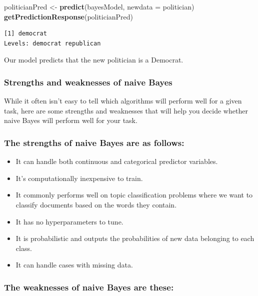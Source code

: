 \documentclass[
]{article}
\newenvironment{Shaded}{\begin{snugshade}}{\end{snugshade}}
\newcommand{\AttributeTok}[1]{\textcolor[rgb]{0.13,0.29,0.53}{#1}}
\newcommand{\FunctionTok}[1]{\textcolor[rgb]{0.13,0.29,0.53}{\textbf{#1}}}
\newcommand{\NormalTok}[1]{#1}
\newcommand{\OtherTok}[1]{\textcolor[rgb]{0.56,0.35,0.01}{#1}}
\providecommand{\tightlist}{%
  \setlength{\itemsep}{0pt}\setlength{\parskip}{0pt}}
\begin{document}
\begin{Shaded}
\begin{Highlighting}[]
\NormalTok{politicianPred }\OtherTok{\textless{}{-}} \FunctionTok{predict}\NormalTok{(bayesModel, }\AttributeTok{newdata =}\NormalTok{ politician)}
\FunctionTok{getPredictionResponse}\NormalTok{(politicianPred)}
\end{Highlighting}
\end{Shaded}

\begin{verbatim}
[1] democrat
Levels: democrat republican
\end{verbatim}

Our model predicts that the new politician is a Democrat.

\subsubsection{Strengths and weaknesses of naive
Bayes}\label{strengths-and-weaknesses-of-naive-bayes}

While it often isn't easy to tell which algorithms will perform well for
a given task, here are some strengths and weaknesses that will help you
decide whether naive Bayes will perform well for your task.

\subsubsection{The strengths of naive Bayes are as
follows:}\label{the-strengths-of-naive-bayes-are-as-follows}

\begin{itemize}
\tightlist
\item
  It can handle both continuous and categorical predictor variables.
\item
  It's computationally inexpensive to train.
\item
  It commonly performs well on topic classification problems where we
  want to classify documents based on the words they contain.
\item
  It has no hyperparameters to tune.
\item
  It is probabilistic and outputs the probabilities of new data
  belonging to each class.
\item
  It can handle cases with missing data.
\end{itemize}

\subsubsection{The weaknesses of naive Bayes are
these:}\label{the-weaknesses-of-naive-bayes-are-these}
\end{document}
